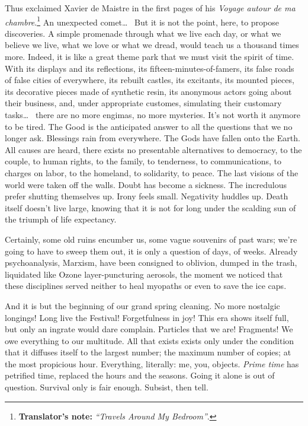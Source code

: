 Thus exclaimed Xavier de Maistre in the first pages of his \textit{Voyage autour de ma chambre}.\footnote{\textbf{Translator's note:} \textit{``Travels Around My Bedroom''}.} An unexpected comet\dots~ But it is not the point, here, to propose discoveries. A simple promenade through what we live each day, or what we believe we live, what we love or what we dread, would teach us a thousand times more. Indeed, it is like a great theme park that we must visit the spirit of time. With its displays and its reflections, its fifteen-minutes-of-famers, its false roads of false cities of everywhere, its rebuilt castles, its excitants, its mounted pieces, its decorative pieces made of synthetic resin, its anonymous actors going about their business, and, under appropriate customes, simulating their customary tasks\dots~ there are no more engimas, no more mysteries. It's not worth it anymore to be tired. The Good is the anticipated answer to all the questions that we no longer ask. Blessings rain from everywhere. The Gods have fallen onto the Earth. All causes are heard, there exists no presentable alternatives to democracy, to the couple, to human rights, to the family, to tenderness, to communications, to charges on labor, to the homeland, to solidarity, to peace. The last visions of the world were taken off the walls. Doubt has become a sickness. The incredulous prefer shutting themselves up. Irony feels small. Negativity huddles up. Death itself doesn't live large, knowing that it is not for long under the scalding sun of the triumph of life expectancy.

Certainly, some old ruins encumber us, some vague souvenirs of past wars; we're going to have to sweep them out, it is only a question of days, of weeks. Already psychoanalysis, Marxism, have been consigned to oblivion, dumped in the trash, liquidated like Ozone layer-puncturing aerosols, the moment we noticed that these disciplines served neither to heal myopaths or even to save the ice caps.

And it is but the beginning of our grand spring cleaning. No more nostalgic longings! Long live the Festival! Forgetfulness in joy! This era shows itself full, but only an ingrate would dare complain. Particles that we are! Fragments! We owe everything to our multitude. All that exists exists only under the condition that it diffuses itself to the largest number; the maximum number of copies; at the most propicious hour. Everything, literally: me, you, objects. \textit{Prime time} has petrified time, replaced the hours and the seasons. Going it alone is out of question. Survival only is fair enough. Subsist, then tell.

